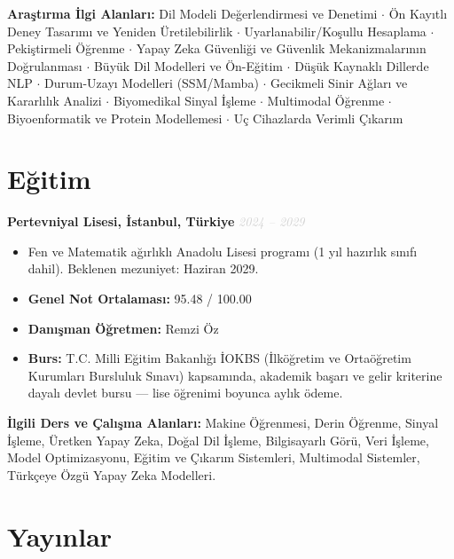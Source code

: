 \documentclass[11pt,a4paper]{article}
\newcommand{\blueitem}[1]{\textcolor{subtitleblue}{\textbf{#1}}}
\newcommand{\daterange}[1]{\hfill \textcolor{lightgray}{\textit{#1}}}
\begin{document}
\textbf{Araştırma İlgi Alanları:} Dil Modeli Değerlendirmesi ve Denetimi $\cdot$ Ön Kayıtlı Deney Tasarımı ve Yeniden Üretilebilirlik $\cdot$ Uyarlanabilir/Koşullu Hesaplama $\cdot$ Pekiştirmeli Öğrenme $\cdot$ Yapay Zeka Güvenliği ve Güvenlik Mekanizmalarının Doğrulanması $\cdot$ Büyük Dil Modelleri ve Ön-Eğitim $\cdot$ Düşük Kaynaklı Dillerde NLP $\cdot$ Durum-Uzayı Modelleri (SSM/Mamba) $\cdot$ Gecikmeli Sinir Ağları ve Kararlılık Analizi $\cdot$ Biyomedikal Sinyal İşleme $\cdot$ Multimodal Öğrenme $\cdot$ Biyoenformatik ve Protein Modellemesi $\cdot$ Uç Cihazlarda Verimli Çıkarım

\section*{Eğitim}

\blueitem{Pertevniyal Lisesi, İstanbul, Türkiye} \daterange{2024 -- 2029}
\begin{itemize}
    \item Fen ve Matematik ağırlıklı Anadolu Lisesi programı (1 yıl hazırlık sınıfı dahil). Beklenen mezuniyet: Haziran 2029.
    \item \textbf{Genel Not Ortalaması:} 95.48 / 100.00
    \item \textbf{Danışman Öğretmen:} Remzi Öz
    \item \textbf{Burs:} T.C. Milli Eğitim Bakanlığı İOKBS (İlköğretim ve Ortaöğretim Kurumları Bursluluk Sınavı) kapsamında, akademik başarı ve gelir kriterine dayalı devlet bursu --- lise öğrenimi boyunca aylık ödeme.
\end{itemize}

\vspace{0.2em}
\textbf{İlgili Ders ve Çalışma Alanları:} Makine Öğrenmesi, Derin Öğrenme, Sinyal İşleme, Üretken Yapay Zeka, Doğal Dil İşleme, Bilgisayarlı Görü, Veri İşleme, Model Optimizasyonu, Eğitim ve Çıkarım Sistemleri, Multimodal Sistemler, Türkçeye Özgü Yapay Zeka Modelleri.

\section*{Yayınlar}
\end{document}
